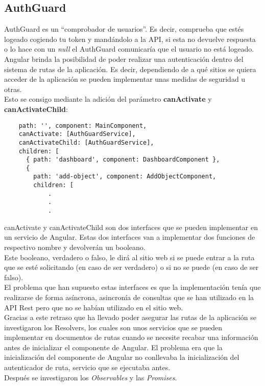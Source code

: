 \subsection{AuthGuard}
AuthGuard \cite{angular-auth-guard} es un ``comprobador de usuarios''. Es decir, comprueba que estés logeado cogiendo tu token y mandándolo a la API, si esta no devuelve respuesta o lo hace con un \textit{null} el AuthGuard comunicaría que el usuario no está logeado.
\\Angular brinda la posibilidad de poder realizar una autenticación dentro del sistema de rutas de la aplicación. Es decir, dependiendo de a qué sitios se quiera acceder de la aplicación se pueden implementar unas medidas de seguridad u otras.
\\Esto se consigo mediante la adición del parámetro \textbf{canActivate} y \textbf{canActivateChild}:
\begin{verbatim}
    path: '', component: MainComponent, 
    canActivate: [AuthGuardService],
    canActivateChild: [AuthGuardService],
    children: [
      { path: 'dashboard', component: DashboardComponent },
      {
        path: 'add-object', component: AddObjectComponent,
        children: [
            .
            .
            .
\end{verbatim}
canActivate y canActivateChild son dos interfaces que se pueden implementar en un servicio de Angular. Estas dos interfaces van a implementar dos funciones de respectivo nombre y devolverán un booleano.
\\Este booleano, verdadero o falso, le dirá al sitio web si se puede entrar a la ruta que se esté solicitando (en caso de ser verdadero) o si no se puede (en caso de ser falso).
\\El problema que han supuesto estas interfaces es que la implementación tenía que realizarse de forma asíncrona, asincronía de consultas que se han utilizado en la API Rest pero que no se habían utilizado en el sitio web.
\\Gracias a este retraso que ha llevado poder asegurar las rutas de la aplicación se investigaron los Resolvers, los cuales son unos servicios que se pueden implementar en documentos de rutas cuando se necesite recabar una información antes de inicializar el componente de Angular. El problema era que la inicialización del componente de Angular no conllevaba la inicialización del autenticador de ruta, servicio que se ejecutaba antes.
\\Después se investigaron los \textit{Observables} y las \textit{Promises}.

